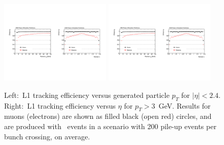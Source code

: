 \begin{figure}[h!tbp]
\begin{center}
  \includegraphics[width=0.47\textwidth]{figures/cmsupgrade/TDR-17-001_fig6_6_a.pdf} \hfill
  \includegraphics[width=0.47\textwidth]{figures/cmsupgrade/TDR-17-001_fig6_6_b.pdf}
  \caption{ Left:~L1 tracking efficiency versus generated particle $p_T$ for $|\eta| < 2.4$.
	Right:~L1 tracking efficiency versus $\eta$ for $p_T > 3$~GeV. Results for muons (electrons) are shown as filled black (open red) circles, and are produced with \ttbar~events in a scenario with 200 pile-up events per bunch crossing, on average. }
  \label{fig:cmsL1lepton}
\end{center}
\end{figure}

